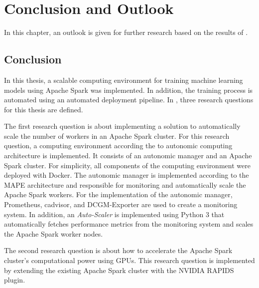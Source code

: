 \chapter{Conclusion and Outlook}
\label{chap:08_outlook}

In this chapter, an outlook is given for further research based on the results of .


\section{Conclusion}
In this thesis, a scalable computing environment for training machine learning models using Apache Spark was implemented. In addition, the training process is automated using an automated deployment pipeline.
In , three research questions for this thesis are defined.


The first research question is about implementing a solution to automatically scale the number of workers in an Apache Spark cluster.
For this research question, a computing environment according the to autonomic computing architecture is implemented.
It consists of an autonomic manager and an Apache Spark cluster.
For simplicity, all components of the computing environment were deployed with Docker.
The autonomic manager is implemented according to the MAPE architecture and responsible for monitoring and automatically scale the Apache Spark workers.
For the implementation of the autonomic manager, Prometheus, cadvisor, and DCGM-Exporter are used to create a monitoring system.
In addition, an \textit{Auto-Scaler} is implemented using Python 3 that automatically fetches performance metrics from the monitoring system and scales the Apache Spark worker nodes.


The second research question is about how to accelerate the Apache Spark cluster's computational power using GPUs.
This research question is implemented by extending the existing Apache Spark cluster with the NVIDIA RAPIDS plugin.
%


